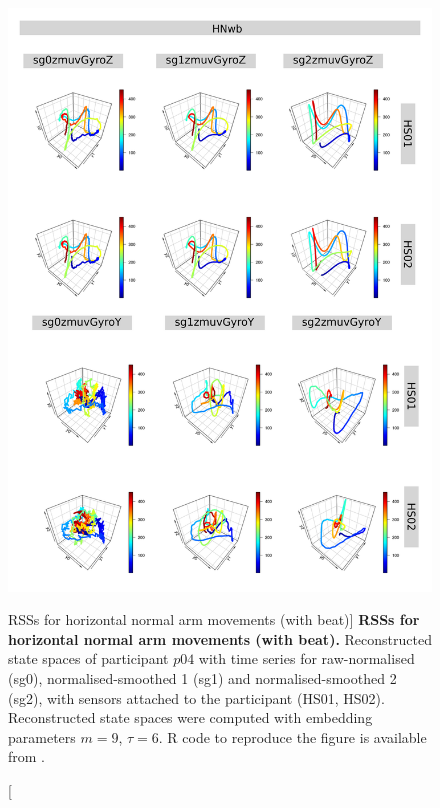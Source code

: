 


\begin{figure}
\centering
\includegraphics[height=0.8\textheight]{rss_HNwb_p04}
\caption
	[RSSs for horizontal normal arm movements (with beat)]{
	{\bf RSSs for horizontal normal arm movements (with beat).}
	Reconstructed state spaces of participant $p04$
	with time series for raw-normalised (sg0), 
	normalised-smoothed 1 (sg1) and 
	normalised-smoothed 2 (sg2), 
	with sensors attached to the participant (HS01, HS02).
	Reconstructed state spaces were computed with 
	embedding parameters $m=9$, $\tau=6$.
	R code to reproduce the figure is available from \cite{hwum2018}.
        }
     \label{fig:rss_HNwb_p04}
\end{figure}






